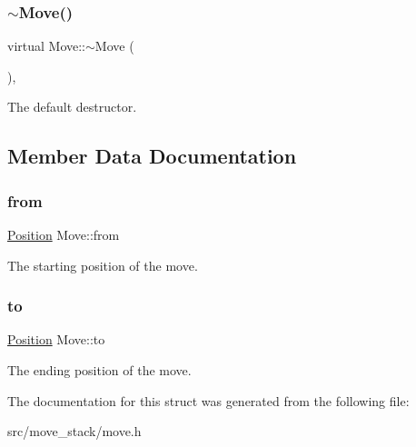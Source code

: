 \subsubsection{\texorpdfstring{$\sim$Move()}{~Move()}}
{\footnotesize\ttfamily virtual Move\+::$\sim$\+Move (\begin{DoxyParamCaption}{ }\end{DoxyParamCaption})\hspace{0.3cm}{\ttfamily [virtual]}, {\ttfamily [default]}}



The default destructor. 



\subsection{Member Data Documentation}
\mbox{\label{struct_move_add76f7fa185380a7a02b6904bf48dc87}} 
\subsubsection{\texorpdfstring{from}{from}}
{\footnotesize\ttfamily \mbox{\hyperlink{struct_position}{Position}} Move\+::from}

The starting position of the move. \mbox{\label{struct_move_a6b0d3fd05bd190244015848d4a1b0aae}} 
\subsubsection{\texorpdfstring{to}{to}}
{\footnotesize\ttfamily \mbox{\hyperlink{struct_position}{Position}} Move\+::to}

The ending position of the move. 

The documentation for this struct was generated from the following file\+:\begin{DoxyCompactItemize}
\item 
src/move\+\_\+stack/move.\+h\end{DoxyCompactItemize}
